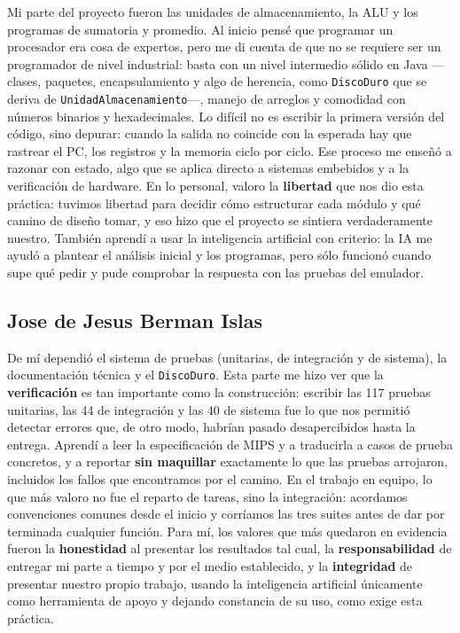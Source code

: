 \documentclass[11pt,letterpaper,oneside]{article}
\begin{document}
Mi parte del proyecto fueron las unidades de almacenamiento, la ALU y los
programas de sumatoria y promedio. Al inicio pensé que programar un procesador
era cosa de expertos, pero me di cuenta de que no se requiere ser un programador
de nivel industrial: basta con un nivel intermedio sólido en Java ---clases,
paquetes, encapsulamiento y algo de herencia, como \texttt{DiscoDuro} que se
deriva de \texttt{UnidadAlmacenamiento}---, manejo de arreglos y comodidad con
números binarios y hexadecimales. Lo difícil no es escribir la primera versión
del código, sino depurar: cuando la salida no coincide con la esperada hay que
rastrear el PC, los registros y la memoria ciclo por ciclo. Ese proceso me
enseñó a razonar con estado, algo que se aplica directo a sistemas embebidos y
a la verificación de hardware. En lo personal, valoro la \textbf{libertad} que
nos dio esta práctica: tuvimos libertad para decidir cómo estructurar cada
módulo y qué camino de diseño tomar, y eso hizo que el proyecto se sintiera
verdaderamente nuestro. También aprendí a usar la inteligencia artificial
con criterio: la IA me ayudó a plantear el análisis inicial y los programas,
pero sólo funcionó cuando supe qué pedir y pude comprobar la respuesta con las
pruebas del emulador.

\subsection{Jose de Jesus Berman Islas}

De mí dependió el sistema de pruebas (unitarias, de integración y de sistema),
la documentación técnica y el \texttt{DiscoDuro}. Esta parte me hizo ver que la
\textbf{verificación} es tan importante como la construcción: escribir las 117
pruebas unitarias, las 44 de integración y las 40 de sistema fue lo que nos
permitió detectar errores que, de otro modo, habrían pasado desapercibidos
hasta la entrega. Aprendí a leer la especificación de MIPS y a traducirla a
casos de prueba concretos, y a reportar \textbf{sin maquillar} exactamente lo
que las pruebas arrojaron, incluidos los fallos que encontramos por el camino.
En el trabajo en equipo, lo que más valoro no fue el reparto de tareas, sino la
integración: acordamos convenciones comunes desde el inicio y corríamos las tres
suites antes de dar por terminada cualquier función. Para mí, los valores que
más quedaron en evidencia fueron la \textbf{honestidad} al presentar los
resultados tal cual, la \textbf{responsabilidad} de entregar mi parte a tiempo
y por el medio establecido, y la \textbf{integridad} de presentar nuestro
propio trabajo, usando la inteligencia artificial únicamente como herramienta
de apoyo y dejando constancia de su uso, como exige esta práctica.
\end{document}
